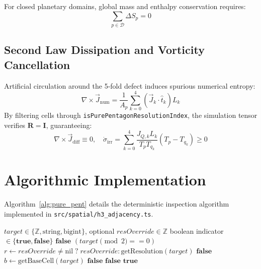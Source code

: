 \documentclass[10pt,journal,compsoc]{IEEEtran}
\begin{document}
For closed planetary domains, global mass and enthalpy conservation requires:
\begin{equation}
\sum_{p \in \mathcal{D}} \Delta S_p = 0
\end{equation}

\subsection{Second Law Dissipation and Vorticity Cancellation}
Artificial circulation around the 5-fold defect induces spurious numerical entropy:
\begin{equation}
\nabla \times \vec{J}_{\mathrm{num}} = \frac{1}{A_p} \sum_{k=0}^4 (\vec{J}_k \cdot \hat{t}_k) L_k
\end{equation}
By filtering cells through \texttt{isPurePentagonResolutionIndex}, the simulation tensor verifies $\mathbf{R} = \mathbf{I}$, guaranteeing:
\begin{equation}
\nabla \times \vec{J}_{\mathrm{diff}} \equiv 0, \quad \dot{\sigma}_{\mathrm{irr}} = \sum_{k=0}^4 \frac{J_{Q, k} L_k}{T_p T_{q_k}} (T_p - T_{q_k}) \ge 0
\end{equation}

\section{Algorithmic Implementation}

Algorithm~\ref{alg:pure_pent} details the deterministic inspection algorithm implemented in \texttt{src/spatial/h3\_adjacency.ts}.

\begin{algorithm}[ht]
\caption{Pure Pentagon Resolution Index Verification}
\label{alg:pure_pent}
\begin{algorithmic}[1]
\REQUIRE $target \in \{\mathbb{Z}, \text{string}, \text{bigint}\}$, optional $resOverride \in \mathbb{Z}$
\ENSURE boolean indicator $\in \{\mathbf{true}, \mathbf{false}\}$
        \RETURN $\mathbf{false}$
    \ENDIF
    \RETURN $(target \pmod 2 == 0)$
\ENDIF
\STATE $r \leftarrow resOverride \ne \text{nil} \; ? \; resOverride : \text{getResolution}(target)$
    \RETURN $\mathbf{false}$
\ENDIF
\STATE $b \leftarrow \text{getBaseCell}(target)$
    \RETURN $\mathbf{false}$
\ENDIF
{}
        \RETURN $\mathbf{false}$
    \ENDIF
\ENDFOR
\RETURN $\mathbf{true}$
\end{algorithmic}
\end{algorithm}
\end{document}
